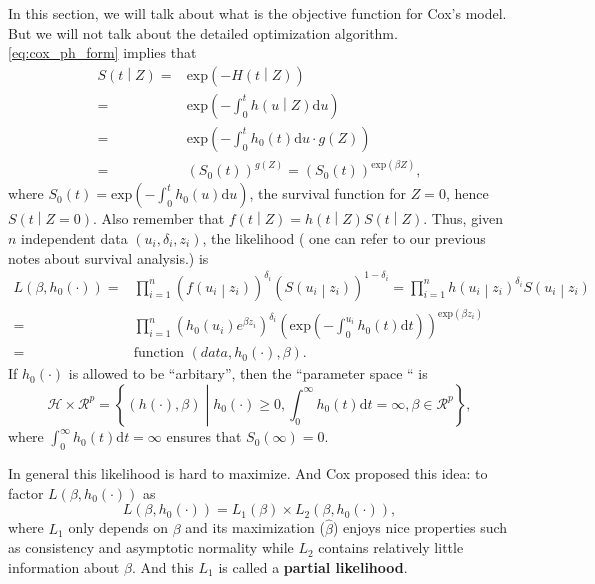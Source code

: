 \documentclass[a4paper,12pt]{article}
\begin{document}
In this section, we will talk about what is the objective function for Cox's model. But we will not talk about the detailed optimization algorithm. \eqref{eq:cox_ph_form} implies that
\[
  \begin{aligned}
    S\left(t\middle|Z\right)
    =& \mathrm{exp}\left(-H\left(t\middle|Z\right)\right)    \\
    =& \mathrm{exp}\left(-\int_0^th\left(u\middle|Z\right)\mathrm{d}u\right)    \\
    =& \mathrm{exp}\left(-\int_0^th_0\left(t\right)\mathrm{d}u \cdot g\left(Z\right)\right)    \\
    =& \left(S_0\left(t\right)\right)^{g\left(Z\right)}
    = \left(S_0\left(t\right)\right)^{\mathrm{exp}\left(\beta Z\right)}
    ,
  \end{aligned}
\]
where $S_0\left(t\right) = \mathrm{exp}\left( - \int_0^t h_0\left(u\right)\mathrm{d}u\right)$, the survival function for $Z = 0$, hence $S\left(t\middle|Z = 0\right)$. Also remember that $f\left(t\middle|Z\right) = h\left(t\middle|Z\right) S\left(t\middle|Z\right)$. Thus, given $n$ independent data $\left(u_i, \delta_i, z_i\right)$, the likelihood ({\color{blue} one can refer to our previous notes about survival analysis.}) is
\begin{equation}
  \label{eq:general_full_likelihood}
    \begin{aligned}
    L\left(\beta, h_0\left(\cdot\right)\right)
    =& \prod\limits_{i = 1}^n
    \left(
      f\left(u_i\middle|z_i\right)
    \right)^{\delta_i}
    \left(
      S\left(u_i\middle|z_i\right)
    \right)^{1 - \delta_i}
    = \prod\limits_{i = 1}^n
    h\left(u_i\middle|z_i\right)^{\delta_i}
    S\left(u_i\middle|z_i\right)    \\
    =& \prod\limits_{i = 1}^n
    \left(
      h_0\left(u_i\right)
      e^{\beta z_i}
    \right)^{\delta_i}
    \left(
      \mathrm{exp}\left(-\int_0^{u_i}h_0\left(t\right)\mathrm{d}t\right)
    \right)^{\mathrm{exp}\left(\beta z_i\right)}    \\
    =& \text{function $\left(data, h_0\left(\cdot\right), \beta\right)$}.
  \end{aligned}
\end{equation}
If $h_0\left(\cdot\right)$ is allowed to be ``arbitary'', then the ``parameter space `` is
\[
  \mathcal{H} \times \mathcal{R}^p
  = \left\{
    \left(h\left(\cdot\right), \beta\right)
    \middle|
    h_0\left(\cdot\right) \geq 0,
    \int_0^\infty h_0\left(t\right)\mathrm{d}t = \infty,
    \beta \in \mathcal{R}^p
  \right\}
  ,
\]
where $\int_0^\infty h_0\left(t\right)\mathrm{d}t = \infty$ ensures that $S_0\left(\infty\right) = 0$.
\par
In general this likelihood is hard to maximize. And Cox proposed this idea: to factor $L\left(\beta, h_0\left(\cdot\right)\right)$ as
\[
  L\left(\beta, h_0\left(\cdot\right)\right)
  = L_1\left(\beta\right)
  \times
  L_2\left(\beta, h_0\left(\cdot\right)\right)
  ,
\]
where $L_1$ only depends on $\beta$ and its maximization ($\hat{\beta}$) enjoys nice properties such as consistency and asymptotic normality while $L_2$ contains relatively little information about $\beta$. And this $L_1$ is called a \textbf{partial likelihood}.
\end{document}

